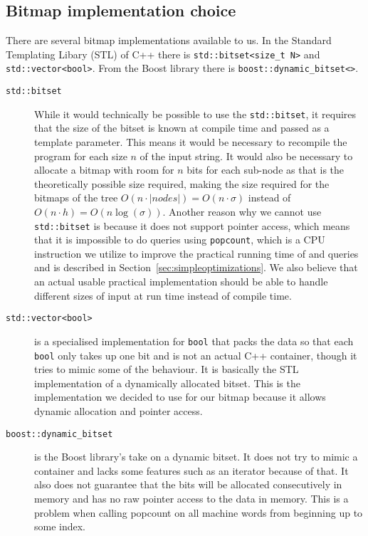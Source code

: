\subsection{Bitmap implementation choice}
There are several bitmap implementations available to us. In the Standard Templating Libary (STL) of C++ there is \texttt{std::bitset<size\_t N>} and \texttt{std::vector<bool>}. From the Boost library there is \texttt{boost::dynamic\_bitset<>}.
\begin{description}
\item[\texttt{std::bitset}] While it would technically be possible to use the \texttt{std::bitset}, it requires that the size of the bitset is known at compile time and passed as a template parameter. This means it would be necessary to recompile the program for each size $n$ of the input string. 
It would also be necessary to allocate a bitmap with room for $n$ bits for each sub-node as that is the theoretically possible size required, making the size required for the bitmaps of the tree $O(n \cdot |nodes|) = O(n \cdot \sigma)$ instead of $O(n \cdot h) = O(n\log(\sigma))$.
Another reason why we cannot use \texttt{std::bitset} is because it does not support pointer access, which means that it is impossible to do queries using \texttt{popcount}, which is a CPU instruction we utilize to improve the practical running time of  and  queries and is described in Section~\ref{sec:simpleoptimizations}.
We also believe that an actual usable practical implementation should be able to handle different sizes of input at run time instead of compile time. 

\item[\texttt{std::vector<bool>}] is a specialised implementation for \texttt{bool} that packs the data so that each \texttt{bool} only takes up one bit and is not an actual C++ container, though it tries to mimic some of the behaviour. 
It is basically the STL implementation of a dynamically allocated bitset. This is the implementation we decided to use for our bitmap because it allows dynamic allocation and pointer access.

\item[\texttt{boost::dynamic\_bitset}] is the Boost library's take on a dynamic bitset. 
It does not try to mimic a container and lacks some features such as an iterator because of that. 
It also does not guarantee that the bits will be allocated consecutively in memory and has no raw pointer access to the data in memory. 
This is a problem when calling popcount on all machine words from beginning up to some index.
\end{description}

